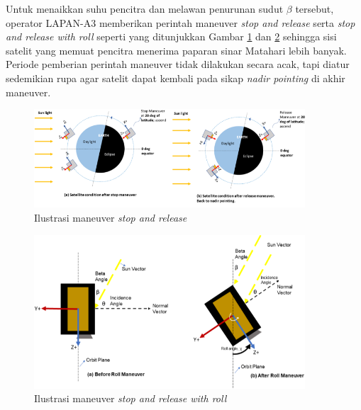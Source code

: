 Untuk menaikkan suhu pencitra dan melawan penurunan sudut $\beta$ tersebut,
operator LAPAN-A3 memberikan perintah maneuver \textit{stop and release} serta
\textit{stop and release with roll} seperti yang ditunjukkan Gambar \ref{fig:maneuver1} dan \ref{fig:maneuver2} sehingga sisi satelit yang memuat pencitra
menerima paparan sinar Matahari lebih banyak. Periode pemberian perintah
maneuver tidak dilakukan secara acak, tapi diatur sedemikian rupa agar satelit
dapat kembali pada sikap \textit{nadir pointing} di akhir maneuver.

\begin{figure}[H]
\setlength{}
\begin{center}
\includegraphics[width=0.9\textwidth]{fig/maneuver1.png}
	\caption[Ilustrasi maneuver \textit{stop and release}]{Ilustrasi maneuver \textit{stop and release}~\cite{ribah2019}}
\label{fig:maneuver1}
\end{center}
\end{figure}

\begin{figure}[H]
\setlength{}
\begin{center}
\includegraphics[width=0.9\textwidth]{fig/maneuver2.png}
	\caption[Ilustrasi maneuver \textit{stop and release with roll}]{Ilustrasi maneuver \textit{stop and release with roll}~\cite{ribah2019}}
\label{fig:maneuver2}
\end{center}
\end{figure}

